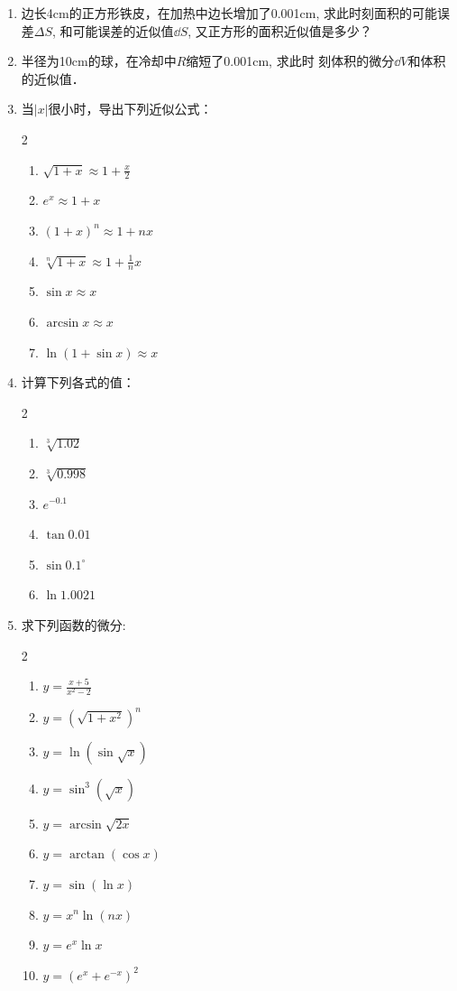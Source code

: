 \begin{ex}
\begin{enumerate}
    \item 边长4cm的正方形铁皮，在加热中边长增加了0.001cm, 
求此时刻面积的可能误差$\Delta S$, 和可能误差的近似值$\dd S$, 又正方形的面积近似值是多少？
\item 半径为10cm的球，在冷却中$R$缩短了0.001cm, 求此时
刻体积的微分$\dd V$和体积的近似值．
\item 当$|x|$很小时，导出下列近似公式：
\begin{multicols}{2}
\begin{enumerate}
    \item  $\sqrt{1+x} \approx 1+\frac{x}{2}$
\item $e^{x} \approx 1+x$
\item  $(1+x)^{n} \approx 1+n x$
\item  $\sqrt[n]{1+x} \approx 1+\frac{1}{n} x$
\item  $\sin x \approx x$
\item  $\arcsin x \approx x$
\item  $\ln (1+\sin x) \approx x$
\end{enumerate}
\end{multicols}

\item  计算下列各式的值：
\begin{multicols}{2}
\begin{enumerate}
\item  $\sqrt[3]{1.02}$
\item  $\sqrt[3]{0.998}$
\item   $e^{-0.1}$
\item   $\tan 0.01$ 
\item   $\sin 0.1^{\circ}$
\item   $\ln 1.0021$   
\end{enumerate}
\end{multicols}

\item 求下列函数的微分:
\begin{multicols}{2}
\begin{enumerate}
    \item $y=\frac{x+5}{x^{2}-2}$
    \item  $y=\left(\sqrt{1+x^{2}}\right)^{n}$
    \item  $y=\ln (\sin \sqrt{x})$
    \item  $y=\sin ^{3}(\sqrt{x})$
    \item  $y=\arcsin \sqrt{2 x}$
    \item  $y=\arctan (\cos x)$ 
    \item $y=\sin (\ln x)$
    \item $y=x^{n} \ln (n x)$
    \item $y=e^{x} \ln x$
    \item $y=\left(e^{x}+e^{-x}\right)^{2}$
\end{enumerate}
\end{multicols}


\end{enumerate}
\end{ex}
